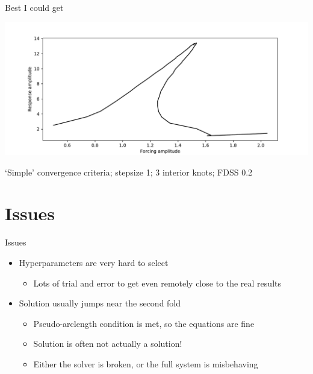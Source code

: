\documentclass[presentation]{beamer}
\begin{document}
\begin{frame}[label={sec:org22a292f}]{Best I could get}
\begin{center}
\includegraphics[width=.9\linewidth]{./stepsize1_dsize3_fdss_0d2_fixed_plotting_new_exterior_knots.pdf}
\end{center}

`Simple' convergence criteria; stepsize 1; 3 interior knots; FDSS 0.2
\end{frame}

\section{Issues}
\label{sec:orga4ca128}
\begin{frame}[label={sec:orgf2662e7}]{Issues}
\begin{itemize}
\item Hyperparameters are very hard to select
\begin{itemize}
\item Lots of trial and error to get even remotely close to the real results
\end{itemize}
\end{itemize}
\vfill
\begin{itemize}
\item Solution usually jumps near the second fold
\begin{itemize}
\item Pseudo-arclength condition is met, so the equations are fine
\item Solution is often not actually a solution!
\item Either the solver is broken, or the full system is misbehaving
\end{itemize}
\end{itemize}
\end{frame}
\end{document}

